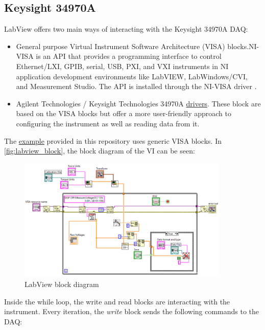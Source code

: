 \documentclass[a4paper]{article}
\begin{document}
{\subsection{Keysight 34970A}

LabView offers two main ways of interacting with the Keysight 34970A DAQ:

\begin{itemize}
	\item General purpose Virtual Instrument Software Architecture (VISA) blocks.NI-VISA is an API that provides a programming interface to control Ethernet/LXI, GPIB, serial, USB, PXI, and VXI instruments in NI application development environments like LabVIEW, LabWindows/CVI, and Measurement Studio. The API is installed through the NI-VISA driver \cite{NIVISA}.
	\item Agilent Technologies / Keysight Technologies 34970A \hyperref{http://sine.ni.com/apps/utf8/niid_web_display.model_page?p_model_id=5547}{category}{name}{drivers}. These block are based on the VISA blocks but offer a more user-friendly approach to configuring the instrument as well as reading data from it. 
\end{itemize}

The \hyperref{https://github.com/IrisDuMutel/ATIMini40_software/tree/master/LabView}{cat1}{visa}{example}  provided in this repository uses generic VISA blocks. In \autoref{fig:labview_block}, the block diagram of the VI can be seen:

\begin{figure}[!h]
	\centering
	\includegraphics[width=0.9\textwidth]{labview_block.png}
	\caption{LabView block diagram}
	\label{fig:labview_block}
\end{figure}

Inside the while loop, the write and read blocks are interacting with the instrument. Every iteration, the \textit{write} block sends the following commands to the DAQ:

}
\end{document}
